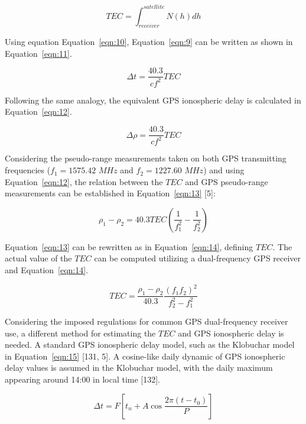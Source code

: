 \documentclass[sn-mathphys-num]{sn-jnl}%
\begin{document}
\begin{equation}
	TEC = \int_{receiver}^{satellite} N(h)dh
	\label{eqn:10}
\end{equation}

Using equation Equation~\ref{eqn:10}, Equation~\ref{eqn:9} can be written as shown in Equation~\ref{eqn:11}.

\begin{equation}
	\Delta t = \frac{40.3}{c f^{2}} TEC
	\label{eqn:11}
\end{equation}

Following the same analogy, the equivalent GPS ionospheric delay is calculated in Equation~\ref{eqn:12}.

\begin{equation}
	\Delta \rho = \frac{40.3}{c f^{2}} TEC
	\label{eqn:12}
\end{equation}

Considering the pseudo-range measurements taken on both GPS transmitting frequencies ($f_{1}=1575.42$ $MHz$ and $f_{2}=1227.60$ $MHz$) and using Equation~\ref{eqn:12}, the relation between the $TEC$ and GPS pseudo-range measurements can be established in Equation~\ref{eqn:13} [5]:
 
\begin{equation}
	\rho_{1} - \rho_{2} = 40.3 TEC \left( \frac{1}{f_{1}^{2}} - \frac{1}{f_{2}^{2}} \right)
	\label{eqn:13}
\end{equation}

Equation~\ref{eqn:13} can be rewritten as in Equation~\ref{eqn:14}, defining $TEC$. The actual value of the $TEC$ can be computed utilizing a dual-frequency GPS receiver and Equation~\ref{eqn:14}.

\begin{equation}
	TEC = \frac{\rho_{1} - \rho_{2}}{40.3} \frac{{\left(f_{1}f_{2}\right)}^{2}}{f_{2}^{2}-f_{1}^{2}}
	\label{eqn:14}
\end{equation}

Considering the imposed regulations for common GPS dual-frequency receiver use, a different method for estimating the $TEC$ and GPS ionospheric delay is needed. A standard GPS ionospheric delay model, such as the Klobuchar model in Equation~\ref{eqn:15} [131, 5]. A cosine-like daily dynamic of GPS ionospheric delay values is assumed in the Klobuchar model, with the daily maximum appearing around 14:00 in local time [132].

\begin{equation}
	\Delta t = F \left[ t_{n} + A \cos \frac{2\pi\left(t-t_{0}\right)}{P} \right]
	\label{eqn:15}
\end{equation}
\end{document}
